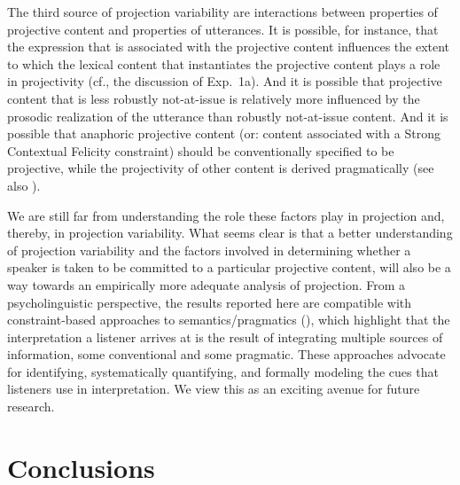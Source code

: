 \documentclass[11pt,fleqn]{article}
\newcommand{\6}{\mbox{$[\hspace*{-.6mm}[$}}
\newcommand{\9}{\mbox{$]\hspace*{-.6mm}]$}}
\begin{document}
The third source of projection variability are interactions between properties of projective content and properties of utterances. It is possible, for instance, that the expression that is associated with the projective content influences the extent to which the lexical content that instantiates the projective content plays a role in projectivity (cf., the discussion of Exp.~1a). And it is possible that projective content that is less robustly not-at-issue is relatively more influenced by the prosodic realization of the utterance than robustly not-at-issue content. And it is possible that anaphoric projective content (or: content associated with a Strong Contextual Felicity constraint) should be conventionally specified to be projective, while the projectivity of other content is derived pragmatically (see also \citealt{brst-ar}).

We are still far from understanding the role these factors play in projection and, thereby, in projection variability. What seems clear is that a better understanding of projection variability and the factors involved in determining whether a speaker is taken to be committed to a particular projective content, will also be a way towards an empirically more adequate analysis of projection. From a psycholinguistic perspective, the results reported here are compatible with constraint-based approaches to semantics/pragmatics (\citealt{degentanenhaus2015}), which highlight that the interpretation a listener arrives at is the result of integrating multiple sources of information, some conventional and some pragmatic. These approaches advocate for identifying, systematically quantifying, and formally modeling the cues that listeners use in interpretation. We view this as an exciting avenue for future research.


\section{Conclusions}\label{s6}
\end{document}

